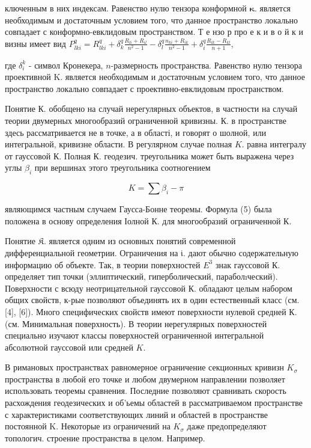 \documentclass[10pt]{article}
\begin{document}
ключенным в них индексам. Равенство нулю тензора конформной $\boldsymbol{\kappa}$. является необходимым и достаточным условием того, что данное пространство локально совпадает с конформно-евклидовым пространством. Т е нзо р про е к и в о й к и визны имеет вид $P_{l k i}^{q}=R_{l k i}^{q}+\delta_{k}^{q} \frac{R_{l i}+R_{i l}}{n^{2}-1}-\delta_{l}^{q} \frac{n_{k i}+R_{i k}}{n^{2}-1}+\delta_{i}^{q} \frac{R_{l k}-R_{k l}}{n+1}$,



где $\delta_{i}^{k}$ - символ Кронекера, $n$-размерность пространства. Равенство нулю тензора проективной $\mathrm{K}$. является необходимым и достаточным условием того, что данное пространство локально совпадает с проективно-евклидовым пространством.



Понятие К. обобщено на случай нерегулярных объектов, в частности на случай теории двумерных многообразий ограниченной кривизны. К. в пространстве здесь рассматривается не в точке, а в області, и говорят о шолной, или интегральной, кривизне области. В регулярном случае полная $K$. равна интегралу от гауссовой К. Полная К. геодезич. треугольника может быть выражена через углы $\beta_{i}$ при вершинах этого треугольника соотногением



\[

K=\sum \beta_{i}-\pi

\]



являющимся частным случаем Гаусса-Бонне теоремы. Формула (5) была положена в основу определения Іолной $К$. для многообразий ограниченной $К$.



Понятие $\mathfrak{K}$. является одним из основных понятий современной дифференциальной геометрии. Ограничения на $\mathfrak{i}$. дают обычно содержательную информацию об объекте. Так, в теории поверхностей $E^{3}$ знак гауссовой К. определяет тип точки (эллиптический, гиперболический, параболıческий). Поверхности с всюду неотрицательной гауссовой $К$. обладают целым набором общих свойств, к-рые позволяют объединять их в один естественный класс (см. [4], [6]). Много специфических свойств имеют поверхности нулевой средней $К$. (см. Минимальная поверхность). В теории нерегулярных поверхностей специально изучают классы поверхностей ограниченной интегральной абсолютной гауссовой или средней $K$.



В римановых пространствах равномерное ограничение секционных кривизн $K_{\sigma}$ пространства в любой его точке и любом двумерном направлении позволяет использовать теоремы сравнения. Последние позволяют сравнивать скорость расхождения геодезических и об'ьемы областей в рассматриваемом пространстве с характеристиками соответствующих линий и областей в пространстве постоянной $\mathrm{K}$. Некоторые из ограничений на $K_{\sigma}$ даже предопределяют топологич. строение пространства в целом. Например.
\end{document}
